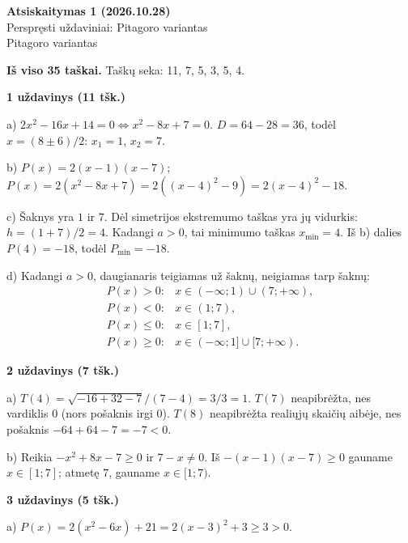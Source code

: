 \documentclass[11pt]{article}
\newcommand{\antraste}[1]{\begin{center}\Large\textbf{Atsiskaitymas 1 (2026.10.28)}\\\large #1\\\normalsize Pitagoro variantas\end{center}}
\newcommand{\sk}[1]{\par\medskip\textbf{#1}\par}
\begin{document}
\antraste{Perspręsti uždaviniai: Pitagoro variantas}
\textbf{Iš viso 35 taškai.} Taškų seka: 11, 7, 5, 3, 5, 4.
\sk{1 uždavinys (11 tšk.)}
a) $2x^2-16x+14=0\iff x^2-8x+7=0$. $D=64-28=36$, todėl
$x=(8\pm6)/2$: $x_1=1$, $x_2=7$.

b) $P(x)=2(x-1)(x-7)$;
$P(x)=2(x^2-8x+7)=2((x-4)^2-9)=2(x-4)^2-18$.

c) Šaknys yra $1$ ir $7$. Dėl simetrijos ekstremumo taškas yra jų vidurkis: $h=(1+7)/2=4$. Kadangi $a>0$, tai minimumo taškas $x_{\min}=4$. Iš b) dalies $P(4)=-18$, todėl $P_{\min}=-18$.

d) Kadangi $a>0$, daugianaris teigiamas už šaknų, neigiamas tarp šaknų:
\[
\begin{array}{ll}
P(x)>0:&x\in(-\infty;1)\cup(7;+\infty),\\
P(x)<0:&x\in(1;7),\\
P(x)\le0:&x\in[1;7],\\
P(x)\ge0:&x\in(-\infty;1]\cup[7;+\infty).
\end{array}
\]
\sk{2 uždavinys (7 tšk.)}
a) $T(4)=\sqrt{-16+32-7}/(7-4)=3/3=1$.
$T(7)$ neapibrėžta, nes vardiklis $0$ (nors pošaknis irgi $0$).
$T(8)$ neapibrėžta realiųjų skaičių aibėje, nes pošaknis $-64+64-7=-7<0$.

b) Reikia $-x^2+8x-7\ge0$ ir $7-x\ne0$.
Iš $-(x-1)(x-7)\ge0$ gauname $x\in[1;7]$; atmetę $7$, gauname
$\boxed{x\in[1;7)}$.
\sk{3 uždavinys (5 tšk.)}
a) $P(x)=2(x^2-6x)+21=2(x-3)^2+3\ge3>0$.
\end{document}

